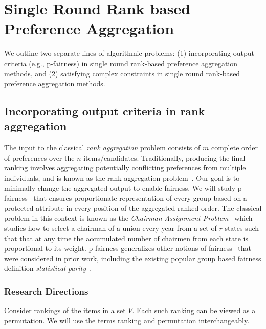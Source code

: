 \documentclass[11pt]{article}
\begin{document}
%
\vspace{-0.2in}
\section{Single Round Rank based Preference Aggregation}\label{aim1}
\vspace{-0.1in}
We outline two separate lines of algorithmic problems: (1) incorporating output criteria (e.g., p-fairness) in single round rank-based preference aggregation methods, and (2) satisfying complex constraints in single round rank-based preference aggregation methods.
\vspace{-0.1in}
\subsection{Incorporating output criteria in rank aggregation} 
\vspace{-0.1in}
The input to the classical {\em rank aggregation} problem consists of $m$ complete order of preferences over the $n$ items/candidates. Traditionally, producing the final ranking involves aggregating potentially conflicting preferences from multiple individuals, and is known as the rank aggregation problem~\cite{dwork2001rank,van2007deterministic, ailon2008aggregating}. Our goal is to  minimally change the aggregated output to enable fairness.
We will study p-fairness~\cite{chairman, pfair} that ensures proportionate representation of every group based on a protected attribute in every position of the aggregated ranked order.  The classical problem in this context is known as the {\em Chairman Assignment Problem}~\cite{baayen1964existence, chairman} which studies how to select a chairman of a union every year from a set of  $r$ states such that  that at any time the accumulated number of chairmen from each state is proportional to its weight. p-fairness generalizes other notions of fairness~\cite{islam2023equitable} that were considered in prior work, including the existing popular group based fairness definition {\em statistical parity}~\cite{dwork2012fairness}. 
\vspace{-0.1in}
\subsubsection{Research Directions}
\vspace{-0.1in}
Consider rankings of the items in a set $V$. Each such ranking can be viewed as a permutation. We will use the terms ranking and permutation interchangeably. 
\end{document}
